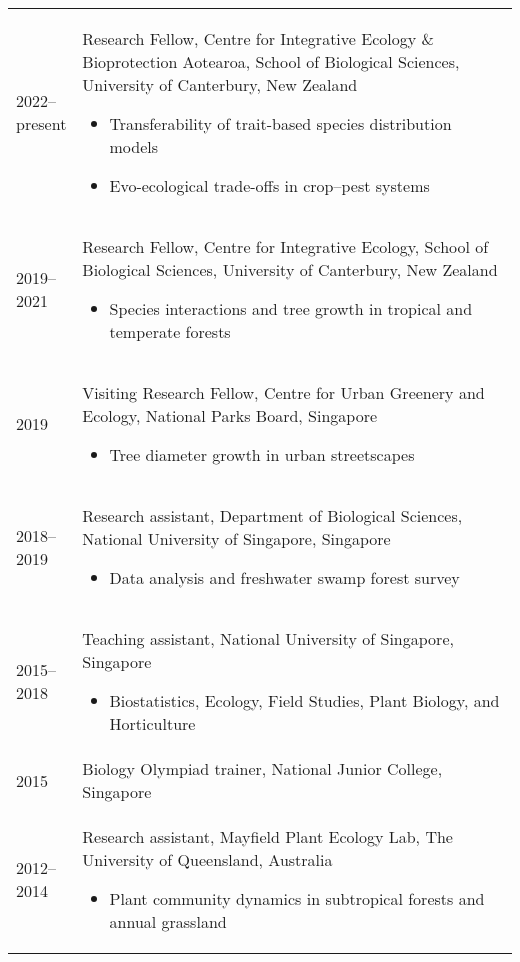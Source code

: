 \documentclass[a4paper]{article}
\begin{document}
\begin{tabular}{p{0.13\linewidth} p{0.87\linewidth}}

2022--present & Research Fellow, Centre for Integrative Ecology \& Bioprotection Aotearoa, School of Biological Sciences, University of Canterbury, New Zealand
\begin{itemize} 
\item Transferability of trait-based species distribution models
\item Evo-ecological trade-offs in crop--pest systems
\end{itemize} \\

2019--2021 & Research Fellow, Centre for Integrative Ecology, School of Biological Sciences, University of Canterbury, New Zealand
\begin{itemize} 
\item Species interactions and tree growth in tropical and temperate forests
\end{itemize} \\

2019 & Visiting Research Fellow, Centre for Urban Greenery and Ecology, National Parks Board, Singapore
\begin{itemize} 
\item Tree diameter growth in urban streetscapes
\end{itemize} \\

2018--2019 & Research assistant, Department of Biological Sciences, National University of Singapore, Singapore
\begin{itemize} 
\item Data analysis and freshwater swamp forest survey
\end{itemize} \\

2015--2018 & Teaching assistant, National University of Singapore, Singapore
\begin{itemize} 
\item Biostatistics, Ecology, Field Studies, Plant Biology, and Horticulture
\end{itemize} \\

2015 & Biology Olympiad trainer, National Junior College, Singapore \\

2012--2014 & Research assistant, Mayfield Plant Ecology Lab, The University of Queensland, Australia 
\begin{itemize}
\item Plant community dynamics in subtropical forests and annual grassland 
\end{itemize} \\


\end{tabular}
\end{document}
